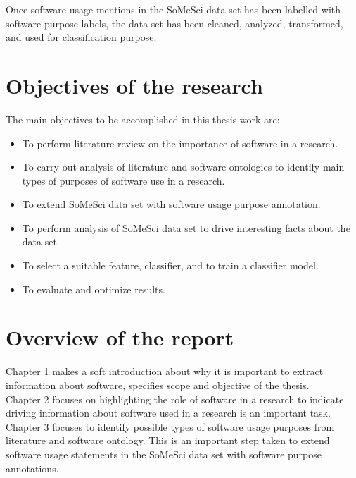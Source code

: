 Once software usage mentions in the SoMeSci data set has been labelled with software purpose labels, the data set has been cleaned, analyzed, transformed, and used for classification purpose.


\section{Objectives of the research}
\label{sec:intro:Objectives}
The main objectives to be accomplished in this thesis work are:


\begin{itemize}
    \item To perform literature review on the importance of software in a research.
    \item To carry out analysis of literature and software ontologies to identify main types of purposes of software use in a research.
    \item	To extend SoMeSci data set with software usage purpose annotation. 
    \item	To perform analysis of SoMeSci data set to drive interesting facts about the data set. 
    \item	To select a suitable feature, classifier, and to train a classifier model.
    \item	To evaluate and optimize results.
	
\end{itemize}


%
%
\section{ Overview of the report }
\label{sec:intro:Overview}

  Chapter 1 makes a soft introduction about why it is important to extract information about software, specifies scope and objective of the thesis. \\

Chapter 2 focuses on highlighting the role of software in a research to indicate driving information about software used in a research is an important task. \\

Chapter 3 focuses to identify possible types of software usage purposes from literature and software ontology. This is an important step taken to extend software usage statements in the SoMeSci data set with software purpose annotations. \\

